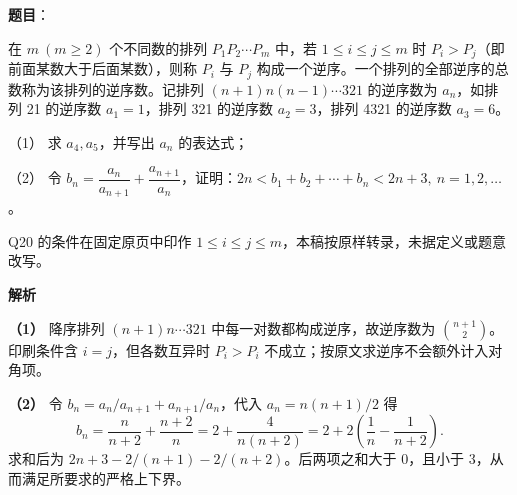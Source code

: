 \begin{answer}

\textbf{题目}：

在 $m\ (m\geqslant2)$ 个不同数的排列 $P_1P_2\cdots P_m$ 中，若 $1\leqslant i\leqslant j\leqslant m$ 时 $P_i>P_j$（即前面某数大于后面某数），则称 $P_i$ 与 $P_j$ 构成一个逆序。一个排列的全部逆序的总数称为该排列的逆序数。记排列 $(n+1)n(n-1)\cdots321$ 的逆序数为 $a_n$，如排列 21 的逆序数 $a_1=1$，排列 321 的逆序数 $a_2=3$，排列 4321 的逆序数 $a_3=6$。

（1） 求 $a_4,a_5$，并写出 $a_n$ 的表达式；

（2） 令 $b_n=\dfrac{a_n}{a_{n+1}}+\dfrac{a_{n+1}}{a_n}$，证明：$2n<b_1+b_2+\cdots+b_n<2n+3,\ n=1,2,\ldots$。

\begin{gktip}
Q20 的条件在固定原页中印作 $1\leqslant i\leqslant j\leqslant m$，本稿按原样转录，未据定义或题意改写。
\end{gktip}

\textbf{解析}

\textbf{（1）} 降序排列 $(n+1)n\cdots321$ 中每一对数都构成逆序，故逆序数为 $\binom{n+1}{2}$。印刷条件含 $i=j$，但各数互异时 $P_i>P_i$ 不成立；按原文求逆序不会额外计入对角项。

\textbf{（2）} 令 $b_n=a_n/a_{n+1}+a_{n+1}/a_n$，代入 $a_n=n(n+1)/2$ 得
\nopagebreak[4]
\[
b_n=\frac{n}{n+2}+\frac{n+2}{n}=2+\frac4{n(n+2)}=2+2\left(\frac1n-\frac1{n+2}\right).
\]
求和后为 $2n+3-2/(n+1)-2/(n+2)$。后两项之和大于 $0$，且小于 $3$，从而满足所要求的严格上下界。



\end{answer}
